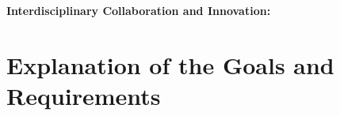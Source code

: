 \textbf{Interdisciplinary Collaboration and Innovation:} %


\section{Explanation of the Goals and Requirements}


